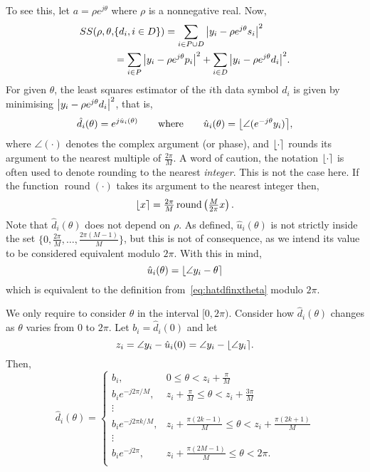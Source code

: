 \documentclass[journal]{IEEEtran}
\begin{document}
To see this, let $a = \rho e^{j\theta}$ where $\rho$ is a nonnegative real.  Now,
\begin{align}
SS(\rho, \theta, &\{d_i, i \in D\}) = \sum_{i \in P \cup D} {\left\vert  y_i - \rho e^{j\theta} s_i  \right\vert}^2  \nonumber \\
&= \sum_{i \in P} {\left\vert  y_i - \rho e^{j\theta} p_i  \right\vert}^2 + \sum_{i \in D} {\left\vert  y_i - \rho e^{j\theta} d_i  \right\vert}^2. \label{eq:SSallparams}
\end{align}
For given $\theta$, the least squares estimator of the $i$th data symbol $d_i$ is given by minimising ${\left\vert  y_i - \rho e^{j\theta} d_i  \right\vert}^2$, that is,
\begin{equation}\label{eq:hatdfinxtheta}
\hat{d}_i(\theta) = e^{j\hat{u}_i(\theta)} \qquad \text{where} \qquad \hat{u}_i(\theta) = {\left\lfloor \angle( e^{-j\theta}y_i) \right\rceil},
\end{equation}
where $\angle(\cdot)$ denotes the complex argument (or phase), and ${\left\lfloor \cdot \right\rceil}$ rounds its argument to the nearest multiple of $\frac{2\pi}{M}$.  A word of caution, the notation ${\left\lfloor \cdot \right\rceil}$ is often used to denote rounding to the nearest \emph{integer}.  This is not the case here.  If the function $\operatorname{round}(\cdot)$ takes its argument to the nearest integer then,
\[
{\left\lfloor x \right\rceil} = \tfrac{2\pi}{M}\operatorname{round}\left(\tfrac{M}{2\pi}x\right).
\] 
Note that $\hat{d}_i(\theta)$ does not depend on $\rho$.  As defined, $\hat{u}_i(\theta)$ is not strictly inside the set $\{0, \tfrac{2\pi}{M}, \dots, \tfrac{2\pi(M-1)}{M}\}$, but this is not of consequence, as we intend its value to be considered equivalent modulo $2\pi$.  With this in mind,
\[
\hat{u}_i(\theta) = {\left\lfloor \angle{y_i} - \theta  \right\rceil}
\]
which is equivalent to the definition from~\eqref{eq:hatdfinxtheta} modulo $2\pi$.

We only require to consider $\theta$ in the interval $[0, 2\pi)$.  Consider how $\hat{d}_i(\theta)$ changes as $\theta$ varies from $0$ to $2\pi$.  Let $b_i = \hat{d}_i(0)$ and let 
\[
z_i = \angle{y_i} - \hat{u}_i(0) = \angle{y_i} - {\left\lfloor \angle{y_i} \right\rceil}.
\]
Then,
\begin{equation}\label{eq:uicombos}
\hat{d}_i(\theta) = 
\begin{cases}
b_i, &  0 \leq \theta < z_i + \frac{\pi}{M} \\
b_i e^{-j2\pi/M}, & z_i + \frac{\pi}{M} \leq \theta < z_i + \frac{3\pi}{M} \\ 
\vdots & \\
b_i e^{-j2\pi k /M}, & z_i + \frac{\pi(2k - 1)}{M} \leq \theta < z_i + \frac{\pi(2k + 1)}{M}  \\ 
\vdots & \\
b_i e^{-j2\pi}, &  z_i + \frac{\pi(2M - 1)}{M} \leq \theta < 2\pi. \\
\end{cases}
\end{equation}
\end{document}
